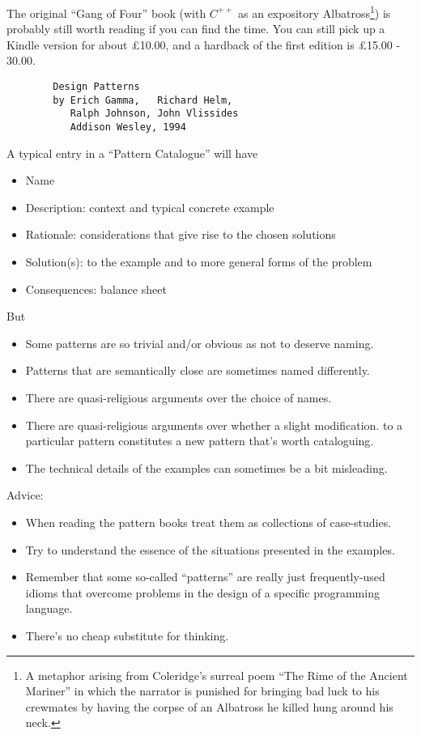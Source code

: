 \documentclass{ip3}
\begin{document}
\begin{foil}[Introduction]
\begin{note}
The original ``Gang of Four'' book (with $C^{+\!+}$ as an expository Albatross\footnote{A metaphor
arising from Coleridge's surreal poem ``The Rime of the Ancient Mariner'' in which the
narrator is punished for bringing bad luck to his crewmates by having the
corpse of an Albatross he killed hung around his neck.}) is 
probably still worth reading if you can find the time. You can still pick
up a Kindle  version for about \pounds 10.00, and a hardback of the first edition
is \pounds 15.00 - 30.00. 
\begin{verbatim}
        Design Patterns
        by Erich Gamma,   Richard Helm, 
           Ralph Johnson, John Vlissides
           Addison Wesley, 1994 
\end{verbatim}

A typical entry in a ``Pattern Catalogue''  will have 
\begin{itemize}
\item Name
\item Description: context and typical concrete example
\item Rationale: considerations that give rise to the chosen solutions
\item Solution(s): to the example and to more general forms of the problem
\item Consequences: balance sheet
\end{itemize}
But
\begin{itemize}
\item Some patterns are so trivial and/or obvious as not to deserve naming.
\item Patterns that are semantically close are sometimes named differently.
\item There are quasi-religious arguments over the choice of names. 
\item There are quasi-religious arguments over whether a slight modification.
to a particular pattern constitutes a new pattern that's worth cataloguing.
\item The technical details of the examples can sometimes be a bit misleading.
\end{itemize}

Advice:
\begin{itemize}
\item When reading the pattern books treat them as collections of case-studies.
\item Try to understand the essence of the situations presented in the examples.
\item Remember that some so-called ``patterns'' are really just frequently-used idioms that overcome
      problems in the design of a specific programming language.
\item There's no cheap substitute for thinking.
\end{itemize}
\end{note}
\end{foil}
\end{document}
